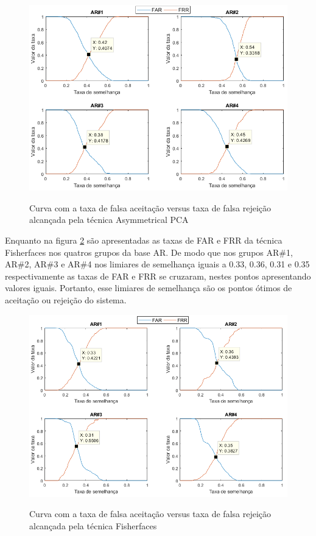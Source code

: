 \begin{figure}[H]
\centering
\caption{Curva com a taxa de falsa aceitação versus taxa de falsa rejeição alcançada pela técnica Asymmetrical PCA}
\includegraphics[scale=0.55]{imgs4/graficos_FAR_FRR/APCA}
\label{fig:FAR_FRR_APCA}
\end{figure}


Enquanto na figura \ref{fig:FAR_FRR_fisherfaces} são apresentadas as taxas de FAR e FRR da técnica Fisherfaces nos quatros grupos da base AR. De modo que nos grupos AR\#1, AR\#2, AR\#3 e AR\#4 nos limiares de semelhança iguais a 0.33, 0.36, 0.31 e 0.35 respectivamente as taxas de FAR e FRR se cruzaram, nestes pontos apresentando valores iguais. Portanto, esse limiares de semelhança são os pontos ótimos de aceitação ou rejeição do sistema. 


\begin{figure}[H]
\centering
\caption{Curva com a taxa de falsa aceitação versus taxa de falsa rejeição alcançada pela técnica Fisherfaces}
\includegraphics[scale=0.55]{imgs4/graficos_FAR_FRR/fisherfaces}
\label{fig:FAR_FRR_fisherfaces}
\end{figure}


